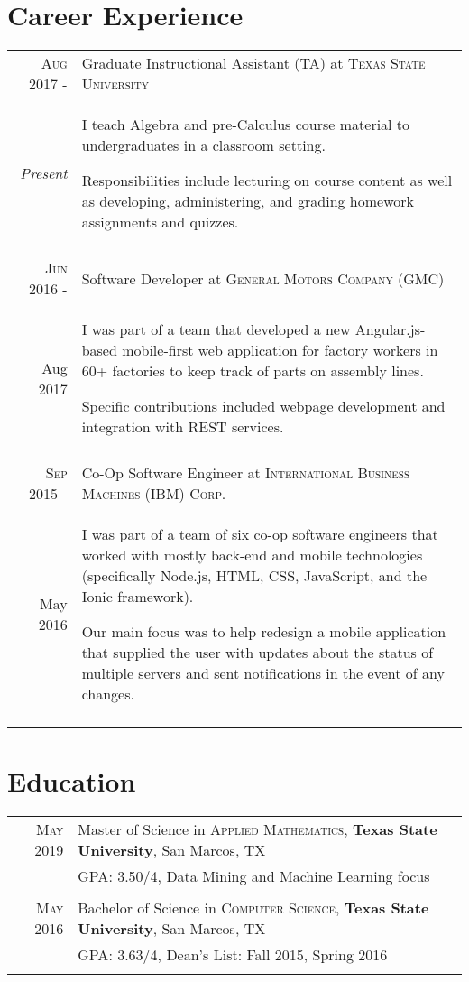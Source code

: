 \documentclass[a4paper,10pt]{article}
\begin{document}
\section{Career Experience}
\begin{tabular}{r|p{12cm}}
\textsc{Aug 2017 -} & Graduate Instructional Assistant (TA) at \textsc{Texas State University} \\
\emph{Present} & \footnotesize{I teach Algebra and pre-Calculus course material to undergraduates in a classroom setting.
 
 	Responsibilities include lecturing on course content as well as developing, administering, and grading homework assignments and quizzes.} \\
 \multicolumn{2}{c}{} \\
 
 \textsc{Jun 2016 -} & Software Developer at \textsc{General Motors Company (GMC)} \\
Aug 2017 & \footnotesize{I was part of a team that developed a new Angular.js-based mobile-first web application for factory workers in 60+ factories to keep track of parts on assembly lines.

Specific contributions included webpage development and integration with REST services.
} \\
 \multicolumn{2}{c}{} \\
 
 \textsc{Sep 2015 -} & Co-Op Software Engineer at \textsc{International Business Machines (IBM) Corp.} \\
 May 2016 & \footnotesize{I was part of a team of six co-op software engineers that worked with mostly back-end and mobile technologies (specifically Node.js, HTML, CSS, JavaScript, and the Ionic framework).

Our main focus was to help redesign a mobile application that supplied the user with updates about the status of multiple servers and sent notifications in the event of any changes.} \\
 \multicolumn{2}{c}{} \\
\end{tabular}

\section{Education}
\begin{tabular}{rl}	
 \textsc{May} 2019 & Master of Science in \textsc{Applied Mathematics}, \textbf{Texas State University}, San Marcos, TX\\
 
&\normalsize \textsc{GPA}: 3.50/4, Data Mining and Machine Learning focus \\ & \\

\textsc{May} 2016 & Bachelor of Science in \textsc{Computer Science}, \textbf{Texas State University}, San Marcos, TX \\

&\normalsize \textsc{GPA}: 3.63/4, Dean’s List: Fall 2015, Spring 2016 \\&\\
\end{tabular}
\end{document}
